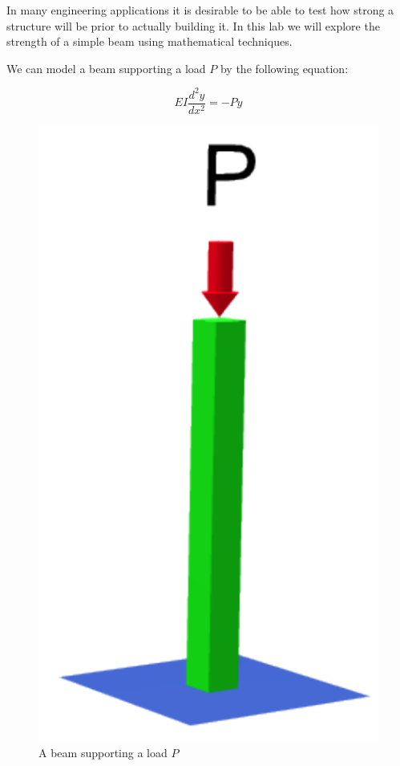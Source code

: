 

In many engineering applications it is desirable to be able to test how strong a structure will be prior to actually building it. In this lab we will explore the strength of a simple beam using mathematical techniques.

We can model a beam supporting a load $P$ by the following equation:

\[
EI \frac{d^2 y}{dx^2} = -P y
\]

\begin{figure}
\begin{center}
\includegraphics[scale = .3]{Buckling.pdf}
\caption{A beam supporting a load $P$}
\label{Fig:Beam}
\end{center}
\end{figure}

